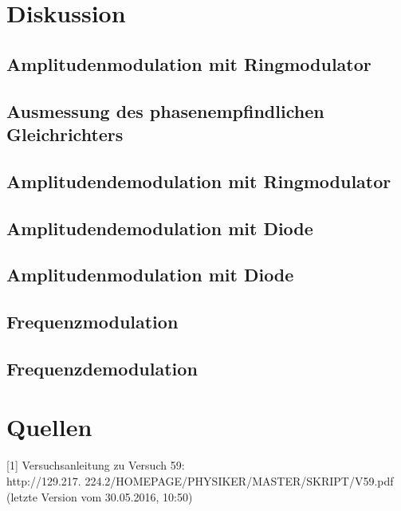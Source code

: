 \documentclass[]{scrartcl}
\begin{document}
\section{Diskussion}
\subsection{Amplitudenmodulation mit Ringmodulator}
\subsection{Ausmessung des phasenempfindlichen Gleichrichters}
\subsection{Amplitudendemodulation mit Ringmodulator}
\subsection{Amplitudendemodulation mit Diode}
\subsection{Amplitudenmodulation mit Diode}
\subsection{Frequenzmodulation}
\subsection{Frequenzdemodulation}
\section{Quellen}
{[1]} Versuchsanleitung zu Versuch 59: \\
http://129.217.
224.2/HOMEPAGE/PHYSIKER/MASTER/SKRIPT/V59.pdf (letzte Version vom 30.05.2016, 10:50)\\
\end{document}
